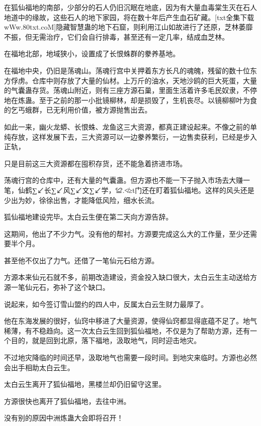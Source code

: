 
\begin{this_body}

在狐仙福地的南部，少部分的石人仍旧沉眠在地底，因为有大量血毒棠生灭在石人地道中的缘故，这些石人的地下家园，将在数十年后产生血石矿藏。[txt全集下载wWw.80txt.coM]隐藏智慧蛊的地下石窟，则利用江山如故进行了还原，芝林萎靡不振，但无需治疗，它们会自行排毒，甚至还有一定几率，结成血芝林。

在福地北部，地域狭小，设置成了长恨蛛群的豢养基地。

在福地中央，仍旧是荡魂山。荡魂行宫中关押着东方长凡的魂魄，残留的数十位东方俘虏。仓库中则存放了大量的仙材。上万斤的油水，天地沙鸥的巨大死蛋，大量的气囊蛊存货。荡魂山附近，则有三座方源石巢，里面生活着许多毛民奴隶，不停地在炼蛊。至于之前的那一小批镜柳林，却是损毁了，生机丧尽。以镜柳柳叶为食的乞丐蛾群，已无利用价值，被方源抛售出去。

如此一来，幽火龙蟒、长恨蛛、龙鱼这三大资源，都真正建设起来。不像之前的单纯存放，这样发展下去，三大资源可以一边豢养繁衍，一边售卖获利，已经是步入正轨，

只是目前这三大资源都在囤积存货，还不能急着挤进市场。

荡魂行宫的仓库中，还有大量的气囊蛊。但方源也不能一下子抛入市场去大赚一笔，仙鹤∑↙长∑↙风∑↙文∑↙学，≌.≮≥t门还在盯着狐仙福地。这样的风头还是少出为妙，徐徐出售，才能降低风险，细水长流。

狐仙福地建设完毕。太白云生便在第二天向方源告辞。

这期间，他出了不少力气。没有他的帮衬。方源要完成这么大的工作量，至少还需要半个月。

甚至他不仅出了力气。还借了一笔仙元石给方源。

方源本来仙元石就不多，前期改造建设，资金投入缺口很大，太白云生主动送给方源一笔仙元石，弥补了这个缺口。

说起来，如今签订雪山盟约的四人中，反属太白云生财力最厚了。

他在东海发展的很好，仙窍中移进了大量资源，使得仙窍都显得底蕴不足了。地气稀薄，有不稳趋向。这一次太白云生回到狐仙福地，不仅是为了帮助方源，还有一个目的，就是回到北原，落下福地，汲取地气，同时迎击地灾。

不过地灾降临的时间还早，汲取地气也需要一段时间。到地灾来临时。方源也必然会出手相助太白云生。

太白云生离开了狐仙福地，黑楼兰却仍旧留守这里。

方源很快也离开了狐仙福地，去往中洲。

没有别的原因中洲炼蛊大会即将召开！


\end{this_body}
